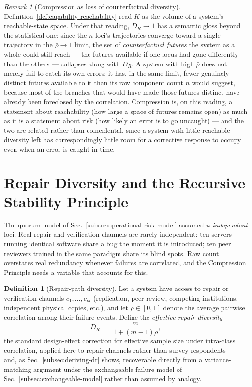 \documentclass[11pt,a4paper]{article}
\theoremstyle{plain}
\theoremstyle{definition}
\newtheorem{definition}[theorem]{Definition}
\theoremstyle{remark}
\newtheorem{remark}[theorem]{Remark}
\newcommand{\DR}{D_R}
\begin{document}
\begin{remark}[Compression as loss of counterfactual diversity]
\label{rem:counterfactual-diversity}
Definition~\ref{def:capability-reachability} read $K$ as the volume of a system's reachable-state space. Under that reading, $\DR \to 1$ has a semantic gloss beyond the statistical one: since the $n$ loci's trajectories converge toward a single trajectory in the $\bar\rho\to1$ limit, the set of \emph{counterfactual futures} the system as a whole could still reach — the futures available if one locus had gone differently than the others — collapses along with $\DR$. A system with high $\bar\rho$ does not merely fail to catch its own errors; it has, in the same limit, fewer genuinely distinct futures available to it than its raw component count $n$ would suggest, because most of the branches that would have made those futures distinct have already been foreclosed by the correlation. Compression is, on this reading, a statement about reachability (how large a space of futures remains open) as much as it is a statement about risk (how likely an error is to go uncaught) — and the two are related rather than coincidental, since a system with little reachable diversity left has correspondingly little room for a corrective response to occupy even when an error is caught in time.
\end{remark}

\section{Repair Diversity and the Recursive Stability Principle}
\label{sec:repair-diversity}

The quorum model of Sec.~\ref{subsec:operational-risk-model} assumed $n$ \emph{independent} loci. Real repair and verification channels are rarely independent: ten servers running identical software share a bug the moment it is introduced; ten peer reviewers trained in the same paradigm share its blind spots. Raw count overstates real redundancy whenever failures are correlated, and the Compression Principle needs a variable that accounts for this.

\begin{definition}[Repair-path diversity]
\label{def:repair-diversity}
Let a system have access to repair or verification channels $c_1,\ldots,c_m$ (replication, peer review, competing institutions, independent physical copies, etc.), and let $\bar\rho \in [0,1]$ denote the average pairwise correlation among their failure events. Define the \emph{effective repair diversity}
\[
\DR \;=\; \frac{m}{1 + (m-1)\bar\rho},
\]
the standard design-effect correction for effective sample size under intra-class correlation, applied here to repair channels rather than survey respondents — and, as Sec.~\ref{subsec:deriving-dr} shows, recoverable directly from a variance-matching argument under the exchangeable failure model of Sec.~\ref{subsec:exchangeable-model} rather than assumed by analogy.
\end{definition}
\end{document}
